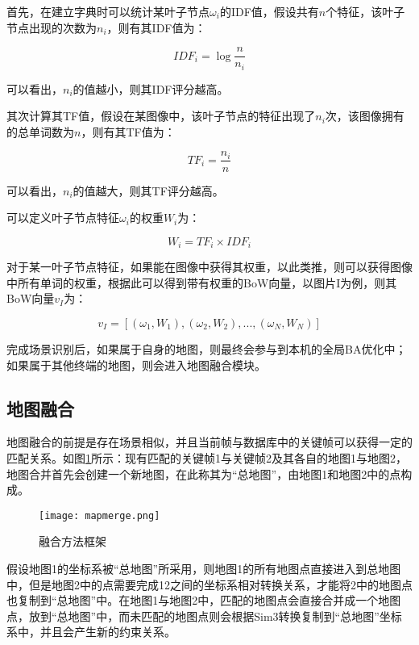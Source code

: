 首先，在建立字典时可以统计某叶子节点$\omega_i$的IDF值，假设共有$n$个特征，该叶子节点出现的次数为$n_i$，则有其IDF值为：

\begin{equation}
IDF_i=\log{\frac{n}{n_i}}
\end{equation}

可以看出，$n_i$的值越小，则其IDF评分越高。

其次计算其TF值，假设在某图像中，该叶子节点的特征出现了$n_i$次，该图像拥有的总单词数为$n$，则有其TF值为：

\begin{equation}
TF_i=\frac{n_i}{n}
\end{equation}

可以看出，$n_i$的值越大，则其TF评分越高。

可以定义叶子节点特征$\omega_i$的权重$W_i$为：

\begin{equation}
W_i = TF_i \times IDF_i
\end{equation}

对于某一叶子节点特征，如果能在图像中获得其权重，以此类推，则可以获得图像中所有单词的权重，根据此可以得到带有权重的BoW向量，以图片I为例，则其BoW向量$v_I$为：

\begin{equation}
v_I = [(\omega_1, W_1), (\omega_2, W_2), ... , (\omega_N, W_N)]
\end{equation}

完成场景识别后，如果属于自身的地图，则最终会参与到本机的全局BA优化中；如果属于其他终端的地图，则会进入地图融合模块。


\subsection{地图融合} \label{3.4.2}

地图融合的前提是存在场景相似，并且当前帧与数据库中的关键帧可以获得一定的匹配关系。如图\ref{fig-mapmerge}所示：现有匹配的关键帧1与关键帧2及其各自的地图1与地图2，地图合并首先会创建一个新地图，在此称其为“总地图”，由地图1和地图2中的点构成。
~\\
\begin{figure}[!ht]
	\centering
	\texttt{[image: mapmerge.png]}
	\caption{融合方法框架}
	\label{fig-mapmerge}
\end{figure}

假设地图1的坐标系被“总地图”所采用，则地图1的所有地图点直接进入到总地图中，但是地图2中的点需要完成12之间的坐标系相对转换关系，才能将2中的地图点也复制到“总地图”中。在地图1与地图2中，匹配的地图点会直接合并成一个地图点，放到“总地图”中，而未匹配的地图点则会根据Sim3转换复制到“总地图”坐标系中，并且会产生新的约束关系。

